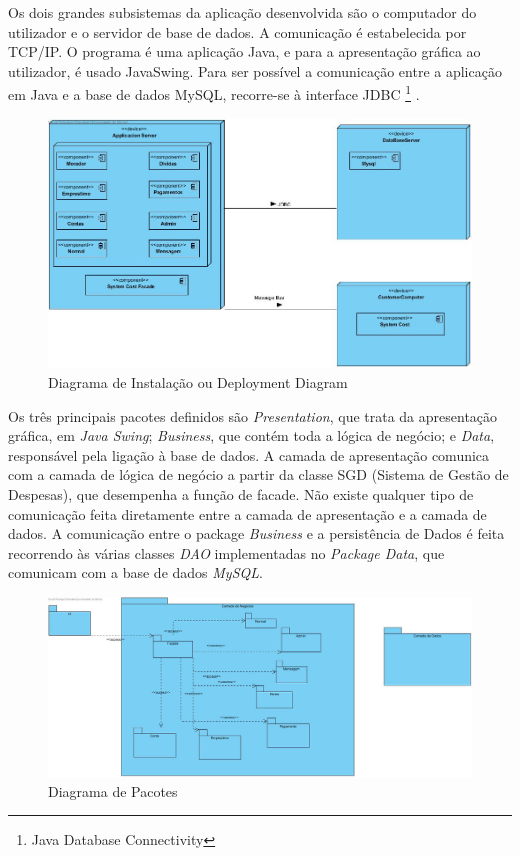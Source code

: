 Os dois grandes subsistemas da aplicação desenvolvida são o computador do utilizador e o servidor de base de dados. A comunicação é estabelecida por TCP/IP. O programa é uma aplicação Java, e para a apresentação gráfica ao utilizador, é usado JavaSwing. Para ser possível a comunicação entre a aplicação em Java e a base de dados MySQL, recorre-se à interface JDBC \footnote{Java Database Connectivity} . 

\begin{figure}[htb!]
	\centering
	\includegraphics[scale=0.4]{imagens/DiagramInstalacao/DeploymentDiagram}  
	\caption{Diagrama de Instalação ou Deployment Diagram}  
\end{figure}

\newpage

Os três principais pacotes definidos são \textit{Presentation}, que trata da apresentação gráfica, em \textit{Java Swing}; \textit{Business}, que contém toda a lógica de negócio; e \textit{Data}, responsável pela ligação à base de dados. A camada de apresentação comunica com a camada de lógica de negócio a partir da classe
SGD (Sistema de Gestão de Despesas), que desempenha a função de facade.
Não existe qualquer tipo de comunicação feita diretamente entre a camada de
apresentação e a camada de dados. A comunicação entre o package \textit{Business}
e a persistência de Dados é feita recorrendo às várias classes \textit{DAO} implementadas no \textit{Package Data}, que comunicam com a base de dados \textit{MySQL}.

\begin{figure}[htb!]
	\centering
	\includegraphics[scale=0.35]{imagens/DiagramInstalacao/PackageDiagram}  
	\caption{Diagrama de Pacotes}  
\end{figure}

